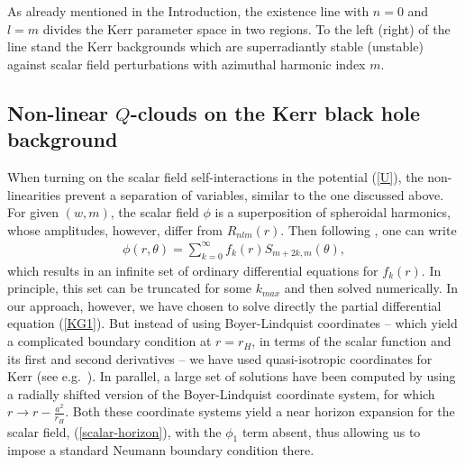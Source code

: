 As already mentioned in the Introduction, the existence line with $n=0$ and $l=m$ divides the Kerr parameter space in two regions. To the left (right) of the line stand the Kerr backgrounds which are superradiantly stable (unstable) against scalar field perturbations with azimuthal harmonic index $m$.


\subsection{Non-linear $Q$-clouds on the Kerr black hole background}

When turning on the scalar field self-interactions in the potential (\ref{U}), the non-linearities prevent a separation of variables, similar to the one discussed above. 
For given $(w,m)$,
the scalar field $\phi$ is a superposition of
spheroidal harmonics, whose amplitudes, however, differ from $R_{nlm}(r)$.
Then following \cite{Volkov:2002aj}, one can write
% 
\begin{eqnarray}
\phi(r,\theta)=\sum_{k=0}^\infty f_k(r)S_{m+2k,m} (\theta),
\end{eqnarray}
%
which results in an infinite set of ordinary differential
equations for $f_k(r)$.
In principle, this set can be truncated for some $k_{max}$
and then solved numerically.
In our approach, however, we have chosen to solve
 directly the partial differential equation (\ref{KG1}). But instead of using Boyer-Lindquist coordinates -- 
 which yield a complicated boundary condition at  $r=r_H$,  in terms of the scalar function and its first and second derivatives -- we have used quasi-isotropic coordinates for Kerr (see e.g.~\cite{Cook:2000vr}).  In parallel, a large set of solutions have been computed  by using a radially shifted version of the Boyer-Lindquist coordinate system, for which $r\to r-\frac{a^2}{r_H}$.
%
Both these coordinate systems yield a near horizon expansion for the scalar field, (\ref{scalar-horizon}), with the $\phi_1$ term absent, thus allowing us to impose a standard Neumann boundary condition there.
                                                                
